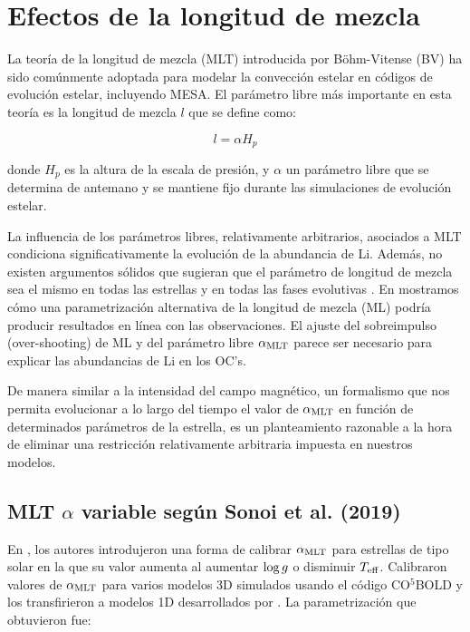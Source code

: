 \section{Efectos de la longitud de mezcla}
La teoría de la longitud de mezcla (MLT) introducida por Böhm-Vitense (BV) ha sido comúnmente adoptada para modelar la convección estelar en códigos de evolución estelar, incluyendo MESA. El parámetro libre más importante en esta teoría es la longitud de mezcla $l$ que se define como:

\begin{ceqn}
	\begin{equation}
		l = \alpha H_p\label{eq:mixlength}
	\end{equation}
\end{ceqn}

donde $H_p$ es la altura de la escala de presión, y $\alpha$ un parámetro libre que se determina de antemano y se mantiene fijo durante las simulaciones de evolución estelar. \par

La influencia de los parámetros libres, relativamente arbitrarios, asociados a MLT condiciona significativamente la evolución de la abundancia de Li. Además, no existen argumentos sólidos que sugieran que el parámetro de longitud de mezcla sea el mismo en todas las estrellas y en todas las fases evolutivas \cite{Pasetto2014}. En \cite{Navarro2020} mostramos cómo una parametrización alternativa de la longitud de mezcla (ML) podría producir resultados en línea con las observaciones. El ajuste del sobreimpulso (over-shooting) de ML y del parámetro libre $\alpha_{\mathrm{MLT}}$ parece ser necesario para explicar las abundancias de Li en los OC's.\par

De manera similar a la intensidad del campo magnético, un formalismo que nos permita evolucionar a lo largo del tiempo el valor de $\alpha_{\mathrm{MLT}}$ en función de determinados parámetros de la estrella, es un planteamiento razonable a la hora de eliminar una restricción relativamente arbitraria impuesta en nuestros modelos.

\subsection{MLT $\alpha$ variable según Sonoi et al. (2019)}
En \cite{Sonoi2018}, los autores introdujeron una forma de calibrar $\alpha_{\mathrm{MLT}}$ para estrellas de tipo solar en la que su valor aumenta al aumentar $\mathrm{log} \, g$ o disminuir $T_{\mathrm{eff}}$. Calibraron valores de $\alpha_{\mathrm{MLT}}$ para varios modelos 3D simulados usando el código CO$^5$BOLD \cite{Freytag2011} y los transfirieron a modelos 1D desarrollados por \cite{Ludwig1998}. La parametrización que obtuvieron fue: 

